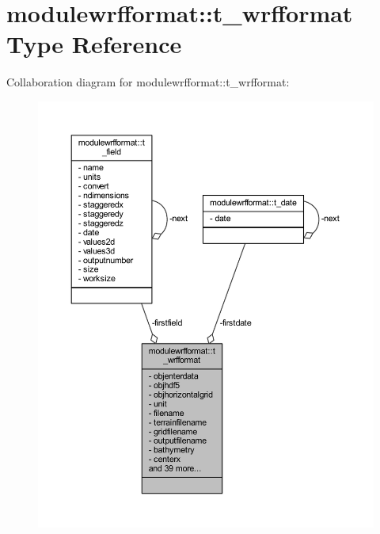 \hypertarget{structmodulewrfformat_1_1t__wrfformat}{}\section{modulewrfformat\+:\+:t\+\_\+wrfformat Type Reference}
\label{structmodulewrfformat_1_1t__wrfformat}


Collaboration diagram for modulewrfformat\+:\+:t\+\_\+wrfformat\+:\nopagebreak
\begin{figure}[H]
\begin{center}
\leavevmode
\includegraphics[width=350pt]{structmodulewrfformat_1_1t__wrfformat__coll__graph}
\end{center}
\end{figure}
